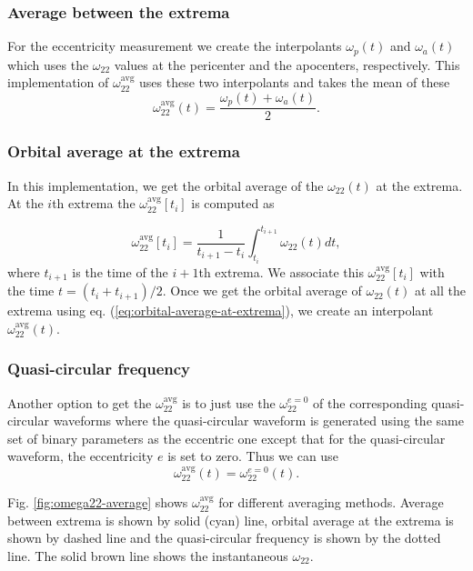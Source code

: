 \documentclass[aps,prd,amsmath,floats,floatfix, twocolumn,
superscriptaddress,nofootinbib,showpacs]{revtex4-1}
\newcommand{\avgOmega}{\omega^{\text{avg}}_{22}}
\newcommand{\zeroOmega}{\omega_{22}^{e=0}}
\begin{document}
\subsubsection{Average between the extrema}
\label{sec:average-between-the-extrema}
For the eccentricity measurement we create the interpolants
$\omega_{p}(t)$ and $\omega_a(t)$ which uses the $\omega_{22}$ values
at the pericenter and the apocenters, respectively. This
implementation of $\avgOmega$ uses these two
interpolants and takes the mean of these
\begin{equation}
  \label{eq:average-between-extrema}
  \avgOmega(t) = \frac{\omega_{p}(t) + \omega_{a}(t)}{2}.
\end{equation}

\subsubsection{Orbital average at the extrema}
\label{sec:orbital-average-at-the-extrema}
In this implementation, we get the orbital average of the
$\omega_{22}(t)$ at the extrema. At the $i$th extrema the
$\avgOmega[t_i]$ is computed as

\begin{equation}
  \label{eq:orbital-average-at-extrema}
  \avgOmega[t_i] = \frac{1}{t_{i+1} -
    t_{i}}\int_{t_{i}}^{t_{i+1}}\omega_{22}(t) dt,
\end{equation}
where $t_{i+1}$ is the time of the $i+1$th extrema. We associate this
$\avgOmega[t_{i}]$ with the time $t = (t_i +
t_{i+1})/2$. Once we get the orbital average of $\omega_{22}(t)$ at
all the extrema using eq. (\ref{eq:orbital-average-at-extrema}), we
create an interpolant $\avgOmega(t)$.

\subsubsection{Quasi-circular frequency}
\label{sec:quasi-circular-frequency}
Another option to get the $\avgOmega$ is to just use
the $\zeroOmega$ of the corresponding quasi-circular waveforms
where the quasi-circular waveform is generated using the same set of
binary parameters as the eccentric one except that for the
quasi-circular waveform, the eccentricity $e$ is set to zero. Thus we
can use
\begin{equation}
  \label{eq:quasi-circular-frequency}
  \avgOmega(t) = \zeroOmega(t).
\end{equation}

Fig. \ref{fig:omega22-average} shows $\avgOmega$ for different
averaging methods. Average between extrema is shown by solid (cyan) line,
orbital average at the extrema is shown by dashed line and the
quasi-circular frequency is shown by the dotted line. The solid brown
line shows the instantaneous $\omega_{22}$.
\end{document}
